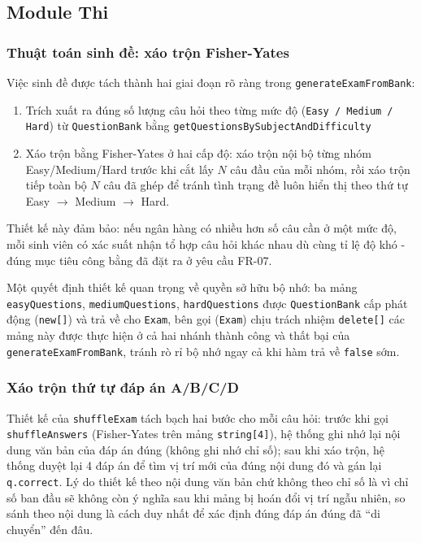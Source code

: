 \documentclass[11pt]{report}
\begin{document}
\subsection{Module Thi}

\subsubsection{Thuật toán sinh đề: xáo trộn Fisher-Yates}

Việc sinh đề được tách thành hai giai đoạn rõ ràng trong \texttt{generateExamFromBank}:
\begin{enumerate}
    \item Trích xuất ra đúng số lượng câu hỏi theo từng mức độ (\texttt{Easy / Medium / Hard}) từ \texttt{QuestionBank} bằng \texttt{getQuestionsBySubjectAndDifficulty}
    \item Xáo trộn bằng Fisher-Yates ở hai cấp độ: xáo trộn nội bộ từng nhóm Easy/Medium/Hard trước khi cắt lấy $N$ câu đầu của mỗi nhóm, rồi xáo trộn tiếp toàn bộ $N$ câu đã ghép để tránh tình trạng đề luôn hiển thị theo thứ tự Easy $\to$ Medium $\to$ Hard. 
\end{enumerate}

Thiết kế này đảm bảo: nếu ngân hàng có nhiều hơn số câu cần ở một mức độ, mỗi sinh viên có xác suất nhận tổ hợp câu hỏi khác nhau dù cùng tỉ lệ độ khó - đúng mục tiêu công bằng đã đặt ra ở yêu cầu FR-07.

Một quyết định thiết kế quan trọng về quyền sở hữu bộ nhớ: ba mảng \texttt{easyQuestions}, \texttt{mediumQuestions}, \texttt{hardQuestions} được \texttt{QuestionBank} cấp phát động (\texttt{new[]}) và trả về cho \texttt{Exam}, bên gọi (\texttt{Exam}) chịu trách nhiệm \texttt{delete[]} các mảng này được thực hiện ở cả hai nhánh thành công và thất bại của \texttt{generateExamFromBank}, tránh rò rỉ bộ nhớ ngay cả khi hàm trả về \texttt{false} sớm.

\subsubsection{Xáo trộn thứ tự đáp án A/B/C/D}
\label{sec:shuffle_answer}

Thiết kế của \texttt{shuffleExam} tách bạch hai bước cho mỗi câu hỏi: trước khi gọi \texttt{shuffleAnswers} (Fisher-Yates trên mảng \texttt{string[4]}), hệ thống ghi nhớ lại nội dung văn bản của đáp án đúng (không ghi nhớ chỉ số); sau khi xáo trộn, hệ thống duyệt lại 4 đáp án để tìm vị trí mới của đúng nội dung đó và gán lại \texttt{q.correct}. Lý do thiết kế theo nội dung văn bản chứ không theo chỉ số là vì chỉ số ban đầu sẽ không còn ý nghĩa sau khi mảng bị hoán đổi vị trí ngẫu nhiên, so sánh theo nội dung là cách duy nhất để xác định đúng đáp án đúng đã ``di chuyển'' đến đâu.
\end{document}
